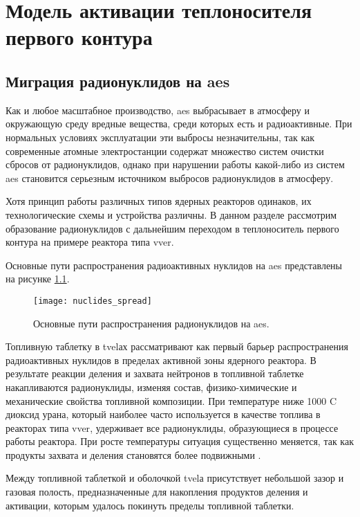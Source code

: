 \chapter{Модель активации теплоносителя первого контура}

\section{Миграция радионуклидов на \ac{aes}}
\label{sec_nuclides_migration}

Как и любое масштабное производство, \ac{aes} выбрасывает в атмосферу и окружающую среду вредные вещества, среди 
которых есть и радиоактивные. При нормальных условиях эксплуатации эти выбросы незначительны, так как современные 
атомные электростанции содержат множество систем очистки сбросов от радионуклидов, однако при нарушении работы 
какой-либо из систем \ac{aes} становится серьезным источником выбросов радионуклидов в атмосферу. 

Хотя принцип работы различных типов ядерных реакторов одинаков, их технологические схемы и устройства различны. В 
данном разделе рассмотрим образование радионуклидов с дальнейшим переходом в теплоноситель первого контура на примере 
реактора типа \ac{vver}.

Основные пути распространения радиоактивных нуклидов на \ac{aes} представлены на рисунке \ref{fig_nuclides_spread}.

\begin{figure}[ht]
\centering
	\texttt{[image: nuclides\_spread]}
	\captionsetup{justification=centering}
    \caption{Основные пути распространения радионуклидов на \ac{aes}.}
    \label{fig_nuclides_spread}
\end{figure}

Топливную таблетку в \ac{tvel}ах рассматривают как первый барьер распространения радиоактивных нуклидов в пределах 
активной зоны ядерного реактора. В результате реакции деления и захвата нейтронов в топливной таблетке накапливаются 
радионуклиды, изменяя состав, физико-химические и механические свойства топливной композиции. При температуре ниже 
1000 \degree C диоксид урана, который наиболее часто используется в качестве топлива в реакторах типа \ac{vver}, 
удерживает все радионуклиды, образующиеся в процессе работы реактора. При росте температуры ситуация существенно 
меняется, так как продукты захвата и деления становятся более подвижными \cite{leskin_vver}.

Между топливной таблеткой и оболочкой \ac{tvel}а присутствует небольшой зазор и газовая полость, предназначенные для 
накопления продуктов деления и активации, которым удалось покинуть пределы топливной таблетки.

